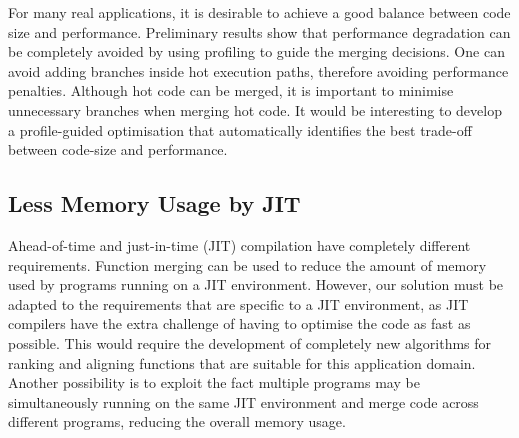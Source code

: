 For many real applications, it is desirable to achieve a good balance between code size and performance.
Preliminary results show that performance degradation can be completely avoided by using profiling to
guide the merging decisions.
One can avoid adding branches inside hot execution paths, therefore avoiding performance penalties.
Although hot code can be merged, it is important to minimise unnecessary branches when merging hot code.
It would be interesting to develop a profile-guided optimisation that automatically identifies the best trade-off between code-size and performance.

\subsection{Less Memory Usage by JIT}

Ahead-of-time and just-in-time (JIT) compilation have completely different requirements.
Function merging can be used to reduce the amount of memory used by programs running on a JIT environment.
However, our solution must be adapted to the requirements that are specific to a JIT environment, as JIT compilers have the extra challenge of having to optimise the code as fast as possible.
This would require the development of completely new algorithms for ranking and aligning functions that are suitable for this application domain.
Another possibility is to exploit the fact multiple programs may be simultaneously running on the same JIT environment and merge code across different programs, reducing the overall memory usage.









